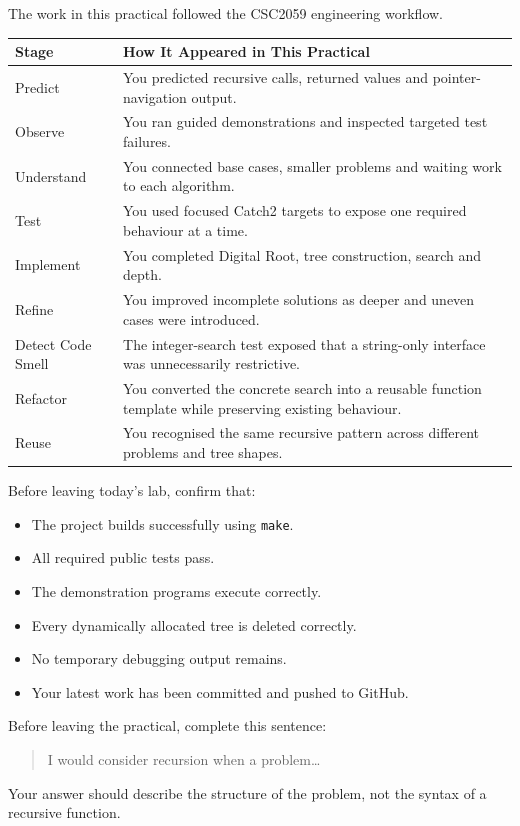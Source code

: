 \documentclass{csc2059practical}
\begin{document}

The work in this practical followed the CSC2059 engineering workflow.

\begin{center}
\begin{tabular}{p{} p{}}
\toprule
\textbf{Stage} & \textbf{How It Appeared in This Practical} \\
\midrule
Predict &
You predicted recursive calls, returned values and pointer-navigation output. \\
Observe &
You ran guided demonstrations and inspected targeted test failures. \\
Understand &
You connected base cases, smaller problems and waiting work to each algorithm. \\
Test &
You used focused Catch2 targets to expose one required behaviour at a time. \\
Implement &
You completed Digital Root, tree construction, search and depth. \\
Refine &
You improved incomplete solutions as deeper and uneven cases were introduced. \\
Detect Code Smell &
The integer-search test exposed that a string-only interface was unnecessarily
restrictive. \\
Refactor &
You converted the concrete search into a reusable function template while
preserving existing behaviour. \\
Reuse &
You recognised the same recursive pattern across different problems and tree
shapes. \\
\bottomrule
\end{tabular}
\end{center}


Before leaving today's lab, confirm that:

\begin{itemize}
    \item The project builds successfully using \texttt{make}.
    \item All required public tests pass.
    \item The demonstration programs execute correctly.
    \item Every dynamically allocated tree is deleted correctly.
    \item No temporary debugging output remains.
    \item Your latest work has been committed and pushed to GitHub.
\end{itemize}

\begin{reflectionbox}
Before leaving the practical, complete this sentence:

\begin{quote}
I would consider recursion when a problem\ldots
\end{quote}

Your answer should describe the structure of the problem, not the syntax of a
recursive function.
\end{reflectionbox}

\end{document}
